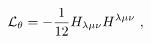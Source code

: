 \begin{equation}\label{2.1}
{\cal L}_\theta = - \frac{1}{12}  H_{\lambda \mu \nu }H ^{\lambda
\mu \nu} ~,
\end{equation}

